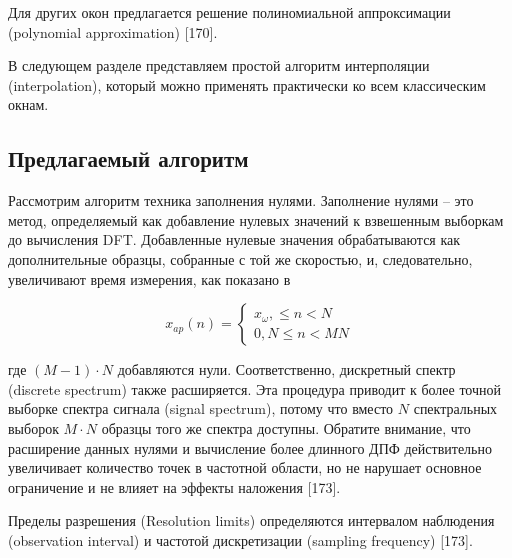 
Для других окон предлагается решение полиномиальной аппроксимации (polynomial approximation) [170]. 

В следующем разделе представляем простой алгоритм интерполяции (interpolation), который можно применять практически ко всем классическим окнам.

\subsection{Предлагаемый алгоритм} \label{sec:ch2/sec5_2}

Рассмотрим алгоритм техника заполнения нулями. Заполнение нулями – это метод, определяемый как добавление нулевых значений к взвешенным выборкам до вычисления DFT. Добавленные нулевые значения обрабатываются как дополнительные образцы, собранные с той же скоростью, и, следовательно, увеличивают время измерения, как показано в 

\begin{equation}
\label{eq:equation21}
x_{ap}(n)=
\begin{cases}
x_{\omega}, \leq n < N
\\ 0, N \leq n < MN
\end{cases}
\end{equation}

где $(M-1) \cdot N$ добавляются нули. Соответственно, дискретный спектр (discrete spectrum) также расширяется. Эта процедура приводит к более точной выборке спектра сигнала (signal spectrum), потому что вместо $N$ спектральных выборок $M \cdot N$ образцы того же спектра доступны. Обратите внимание, что расширение данных нулями и вычисление более длинного ДПФ действительно увеличивает количество точек в частотной области, но не нарушает основное ограничение и не влияет на эффекты наложения [173].

Пределы разрешения  (Resolution limits) определяются интервалом наблюдения (observation interval) и частотой дискретизации (sampling frequency) [173].

